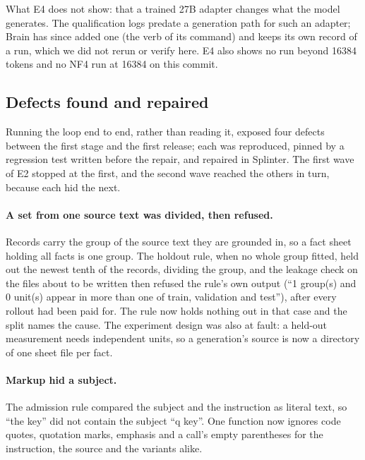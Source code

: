 What E4 does not show: that a trained 27B adapter changes what the model generates. The
qualification logs predate a generation path for such an adapter; Brain has since added one (the
 verb of its  command) and keeps its own record of a run, which
we did not rerun or verify here. E4 also shows no run beyond 16384 tokens and no NF4 run at 16384 on this commit.

\subsection{Defects found and repaired}\label{sec:defects}

Running the loop end to end, rather than reading it, exposed four defects between the
first stage and the first release; each was reproduced, pinned by a regression test written
before the repair, and repaired in Splinter. The first wave of E2 stopped at the first, and
the second wave reached the others in turn, because each hid the next.

\paragraph{A set from one source text was divided, then refused.} Records carry the group
of the source text they are grounded in, so a fact sheet holding all facts is one group.
The holdout rule, when no whole group fitted, held out the newest tenth of the records,
dividing the group, and the leakage check on the files about to be written then refused the
rule's own output (``1 group(s) and 0 unit(s) appear in more than one of train, validation
and test''), after every rollout had been paid for. The rule now holds nothing out in that
case and the split names the cause. The experiment design was also at fault: a held-out
measurement needs independent units, so a generation's source is now a directory of one
sheet file per fact.

\paragraph{Markup hid a subject.} The admission rule compared the subject and the instruction
as literal text, so ``the  key'' did not contain the subject ``q key''. One function
now ignores code quotes, quotation marks, emphasis and a call's empty parentheses for the
instruction, the source and the variants alike.

